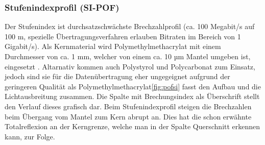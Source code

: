 \subsubsection{Stufenindexprofil (SI-POF)}

Der Stufenindex ist durchsatzschwächste Brechzahlprofil (ca. 100 Megabit/s auf
100 m, spezielle Übertragungsverfahren erlauben Bitraten im Bereich von 1
Gigabit/s). Als Kernmaterial wird Polymethylmethacrylat mit einem Durchmesser
von ca. 1 mm, welcher von einem ca. 10 µm Mantel umgeben ist, eingesetzt
\cite{pofacsi}. Altarnativ kommen auch Polystyrol und Polycarbonat zum Einsatz,
jedoch sind sie für die Datenübertragung eher ungegeignet aufgrund der
geringeren Qualität als Polymethylmethacrylat\autoref{fig:pofsi} fasst den
Aufbau und die Lichtausbreitung zusammen. Die Spalte mit Brechungsindex als
Überschrift stellt den Verlauf dieses grafisch dar. Beim Stufenindexprofil
steigen die Brechzahlen beim Übergang vom Mantel zum Kern abrupt an. Dies hat
die schon erwähnte Totalreflexion an der Kerngrenze, welche man in der Spalte
Querschnitt erkennen kann, zur Folge.

